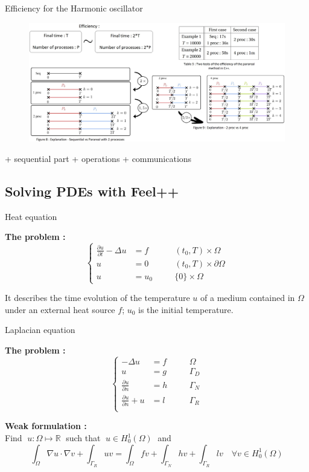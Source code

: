 \begin{frame}{Efficiency for the Harmonic oscillator}
	\begin{figure}
		\centering
		\includegraphics[width=\linewidth]{"images/parareal/efficiency.jpg"}
	\end{figure}
	+ sequential part + operations + communications
\end{frame}

\subsection{Solving PDEs with Feel++}

\begin{frame}{Heat equation}
	
	\textbf{The problem :}
	$$\left\{\begin{aligned}
		\frac{\partial u}{\partial t}-\Delta u &= f \quad&&(t_0,T)\times\Omega \\
		u&=0 \quad&&(t_0,T)\times\partial\Omega\\
		u&=u_0 \quad &&\{0\}\times\Omega
	\end{aligned}\right.$$

	It describes the time evolution of the temperature $u$ of a medium contained in $\Omega$ under an external heat source $f$; $u_0$ is the initial temperature.
	
\end{frame}

\begin{frame}{Laplacian equation}
	
	\textbf{The problem :}
	$$\left\{\begin{aligned}
		-\Delta u &= f \quad&&\Omega \\
		u&=g \quad&&\Gamma_D \\
		\frac{\partial u}{\partial n} &=h \quad &&\Gamma_N \\
		\frac{\partial u}{\partial n}+u &=l \quad &&\Gamma_R \\
	\end{aligned}\right.$$
	
	\textbf{Weak formulation :} \\
	Find $\; u:\Omega \mapsto \mathbb{R} \;$ such that $\; u\in H_0^1(\Omega) \;$ and
	$$\int_\Omega \nabla u \cdot \nabla v + \int_{\Gamma_R}uv = \int_\Omega fv + \int_{\Gamma_N}hv+\int_{\Gamma_R}lv \quad \forall v\in H_0^1(\Omega)$$
	
\end{frame}

